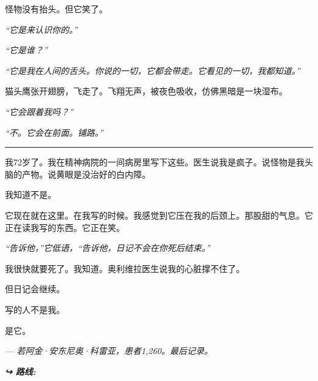 \noindent 怪物没有抬头。但它笑了。

\noindent \textit{“它是来认识你的。”}

\noindent \textit{“它是谁？”}

\noindent \textit{“它是我在人间的舌头。你说的一切，它都会带走。它看见的一切，我都知道。”}

\noindent 猫头鹰张开翅膀，飞走了。飞翔无声，被夜色吸收，仿佛黑暗是一块湿布。

\noindent \textit{“它会跟着我吗？”}

\noindent \textit{“不。它会在前面。铺路。”}

\vspace{0.5em}\noindent\rule{\textwidth}{0.5pt}\vspace{0.5em}

\noindent 我72岁了。我在精神病院的一间病房里写下这些。医生说我是疯子。说怪物是我头脑的产物。说黄眼是没治好的白内障。

\noindent 我知道不是。

\noindent 它现在就在这里。在我写的时候。我感觉到它压在我的后颈上。那股甜的气息。它正在读我写的东西。它正在笑。

\noindent \textit{“告诉他，”它低语，“告诉他，日记不会在你死后结束。”}

\noindent 我很快就要死了。我知道。奥利维拉医生说我的心脏撑不住了。

\noindent 但日记会继续。

\noindent 写的人不是我。

\noindent 是它。

\noindent \textit{--- 若阿金·安东尼奥·科雷亚，患者1,260。最后记录。}

\vspace{0.5em}
\noindent\textit{\textbf{↪ 路线:}  \rotasep {} \rotasep {}}
